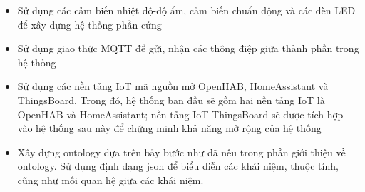 \begin{itemize}
	\item Sử dụng các cảm biến nhiệt độ-độ ẩm, cảm biến chuẩn động và các đèn LED để xây dựng hệ thống phần cứng
	\item Sử dụng giao thức MQTT để gửi, nhận các thông điệp giữa thành phần trong hệ thống
	\item Sử dụng các nền tảng IoT mã nguồn mở OpenHAB, HomeAssistant và ThingsBoard. Trong đó, hệ thống ban đầu sẽ gồm hai nền tảng IoT là OpenHAB và HomeAssistant; nền tảng IoT ThingsBoard sẽ được tích hợp vào hệ thống sau này để chứng minh khả năng mở rộng của hệ thống
	\item Xây dựng ontology dựa trên bảy bước như đã nêu trong phần giới thiệu về ontology. Sử dụng định dạng json để biểu diễn các khái niệm, thuộc tính, cũng như mối quan hệ giữa các khái niệm.
\end{itemize}